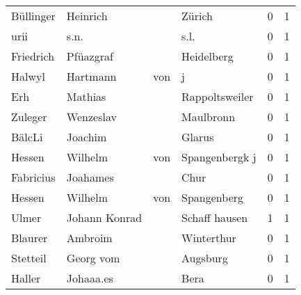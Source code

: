 \begin{tabular}{llllrr}
                Büllinger &                           Heinrich &             &                                      Zürich &          0 &         1 \\
                     urii &                               s.n. &             &                                        s.l. &          0 &         1 \\
                Friedrich &                          Pfüazgraf &             &                                  Heidelberg &          0 &         1 \\
                   Halwyl &                           Hartmann &         von &                                           j &          0 &         1 \\
                      Erh &                            Mathias &             &                              Rappoltsweiler &          0 &         1 \\
                  Zuleger &                          Wenzeslav &             &                                   Maulbronn &          0 &         1 \\
                   BälcLi &                            Joachim &             &                                      Glarus &          0 &         1 \\
                   Hessen &                            Wilhelm &         von &                              Spangenbergk j &          0 &         1 \\
                Fabricius &                           Joahames &             &                                        Chur &          0 &         1 \\
                   Hessen &                            Wilhelm &         von &                                 Spangenberg &          0 &         1 \\
                    Ulmer &                      Johann Konrad &             &                               Schaff hausen &          1 &         1 \\
                  Blaurer &                            Ambroim &             &                                  Winterthur &          0 &         1 \\
                 Stetteil &                          Georg vom &             &                                    Augsburg &          0 &         1 \\
                   Haller &                          Johaaa.es &             &                                        Bera &          0 &         1 \\

\end{tabular}

